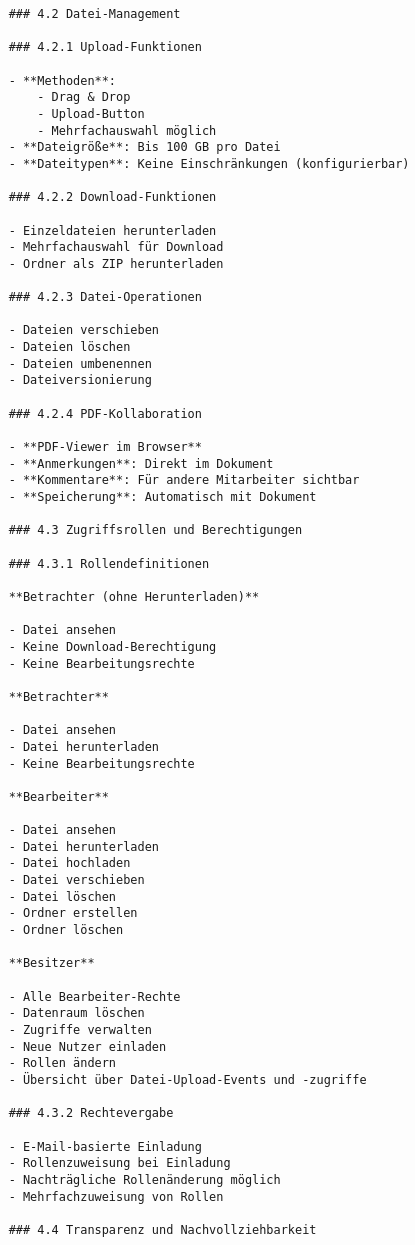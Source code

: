 \begin{verbatim}
    ### 4.2 Datei-Management
    
    ### 4.2.1 Upload-Funktionen
    
    - **Methoden**:
        - Drag & Drop
        - Upload-Button
        - Mehrfachauswahl möglich
    - **Dateigröße**: Bis 100 GB pro Datei
    - **Dateitypen**: Keine Einschränkungen (konfigurierbar)
    
    ### 4.2.2 Download-Funktionen
    
    - Einzeldateien herunterladen
    - Mehrfachauswahl für Download
    - Ordner als ZIP herunterladen
    
    ### 4.2.3 Datei-Operationen
    
    - Dateien verschieben
    - Dateien löschen
    - Dateien umbenennen
    - Dateiversionierung
    
    ### 4.2.4 PDF-Kollaboration
    
    - **PDF-Viewer im Browser**
    - **Anmerkungen**: Direkt im Dokument
    - **Kommentare**: Für andere Mitarbeiter sichtbar
    - **Speicherung**: Automatisch mit Dokument
    
    ### 4.3 Zugriffsrollen und Berechtigungen
    
    ### 4.3.1 Rollendefinitionen
    
    **Betrachter (ohne Herunterladen)**
    
    - Datei ansehen
    - Keine Download-Berechtigung
    - Keine Bearbeitungsrechte
    
    **Betrachter**
    
    - Datei ansehen
    - Datei herunterladen
    - Keine Bearbeitungsrechte
    
    **Bearbeiter**
    
    - Datei ansehen
    - Datei herunterladen
    - Datei hochladen
    - Datei verschieben
    - Datei löschen
    - Ordner erstellen
    - Ordner löschen
    
    **Besitzer**
    
    - Alle Bearbeiter-Rechte
    - Datenraum löschen
    - Zugriffe verwalten
    - Neue Nutzer einladen
    - Rollen ändern
    - Übersicht über Datei-Upload-Events und -zugriffe
    
    ### 4.3.2 Rechtevergabe
    
    - E-Mail-basierte Einladung
    - Rollenzuweisung bei Einladung
    - Nachträgliche Rollenänderung möglich
    - Mehrfachzuweisung von Rollen
    
    ### 4.4 Transparenz und Nachvollziehbarkeit
    

\end{verbatim}
